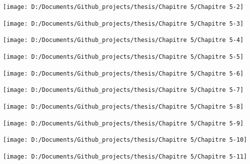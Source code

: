 \documentclass[
  english,
  man]{apa6}
\begin{document}
\begin{center}\texttt{[image: D:/Documents/Github\_projects/thesis/Chapitre 5/Chapitre 5-2]} \end{center}

\begin{center}\texttt{[image: D:/Documents/Github\_projects/thesis/Chapitre 5/Chapitre 5-3]} \end{center}

\begin{center}\texttt{[image: D:/Documents/Github\_projects/thesis/Chapitre 5/Chapitre 5-4]} \end{center}

\begin{center}\texttt{[image: D:/Documents/Github\_projects/thesis/Chapitre 5/Chapitre 5-5]} \end{center}

\begin{center}\texttt{[image: D:/Documents/Github\_projects/thesis/Chapitre 5/Chapitre 5-6]} \end{center}

\begin{center}\texttt{[image: D:/Documents/Github\_projects/thesis/Chapitre 5/Chapitre 5-7]} \end{center}

\begin{center}\texttt{[image: D:/Documents/Github\_projects/thesis/Chapitre 5/Chapitre 5-8]} \end{center}

\begin{center}\texttt{[image: D:/Documents/Github\_projects/thesis/Chapitre 5/Chapitre 5-9]} \end{center}

\begin{center}\texttt{[image: D:/Documents/Github\_projects/thesis/Chapitre 5/Chapitre 5-10]} \end{center}

\begin{center}\texttt{[image: D:/Documents/Github\_projects/thesis/Chapitre 5/Chapitre 5-11]} \end{center}
\end{document}
